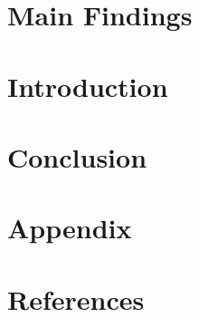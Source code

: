 \documentclass[a4paper,draft]{scrreprt}
\begin{document}
\maketitle
\chapter{Main Findings} %

\chapter{Introduction}

\chapter{Conclusion}

\chapter{Appendix}




\chapter{References}

\end{document}
